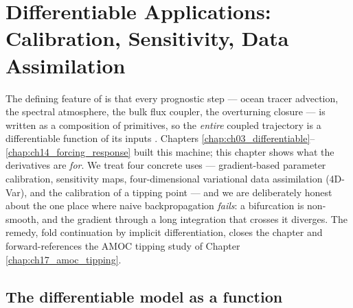 \chapter{Differentiable Applications: Calibration, Sensitivity, Data Assimilation}
\label{chap:ch15_differentiable_applications}

\providecommand{\Jcost}{\mathcal{J}}          %
\providecommand{\dST}{\Delta S}               %
\providecommand{\Fcrit}{F_{\mathrm{crit}}}    %
\providecommand{\param}{\boldsymbol{\theta}}  %

The defining feature of \model{} is that every prognostic step --- ocean tracer
advection, the \dino{} spectral atmosphere, the bulk flux coupler, the
overturning closure --- is written as a composition of \jax{} primitives, so the
\emph{entire} coupled trajectory is a differentiable function of its inputs
\citep{jax2018}. Chapters \ref{chap:ch03_differentiable}--\ref{chap:ch14_forcing_response}
built this machine; this chapter shows what the derivatives are \emph{for}. We
treat four concrete uses --- gradient-based parameter calibration, sensitivity
maps, four-dimensional variational data assimilation (4D-Var), and the calibration
of a tipping point --- and we are deliberately honest about the one place where
naive backpropagation \emph{fails}: a bifurcation is non-smooth, and the gradient
through a long integration that crosses it diverges. The remedy, fold
continuation by implicit differentiation, closes the chapter and forward-references
the AMOC tipping study of Chapter \ref{chap:ch17_amoc_tipping}.

\section{The differentiable model as a function}

